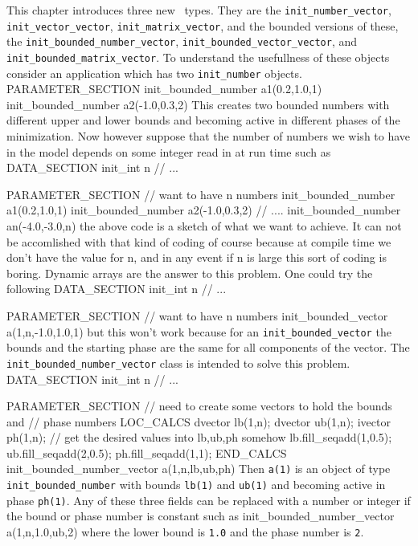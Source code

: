 %
%
This chapter introduces three new \ADM\ types. They are
the {\tt init\_number\_vector}, {\tt init\_vector\_vector}, 
{\tt init\_matrix\_vector}, and the bounded versions of these,
the {\tt init\_bounded\_number\_vector}, {\tt init\_bounded\_vector\_vector}, 
and {\tt init\_bounded\_matrix\_vector}.
To understand the usefullness of these objects consider an application
which has two {\tt init\_number} objects.
\beginexample
PARAMETER_SECTION
  init_bounded_number a1(0.2,1.0,1)
  init_bounded_number a2(-1.0,0.3,2)
\endexample 
\noindent This creates two bounded numbers with different
upper and lower bounds and becoming active in different phases
of the minimization.
Now however suppose that the number of numbers we wish to
have in the model depends on some integer read in at run time such as
\beginexample
DATA_SECTION
  init_int n
 //  ...

PARAMETER_SECTION
  // want to have n numbers
  init_bounded_number a1(0.2,1.0,1)
  init_bounded_number a2(-1.0,0.3,2)
  // ....
  init_bounded_number an(-4.0,-3.0,n)
\endexample 
\noindent the above code is a sketch of what we want to 
achieve. It can not be accomlished with that kind of coding
of course because at compile time we don't have the value for n,
and in any event if n is large this sort of coding is boring.
Dynamic arrays are the answer to this problem. One could try
the following
\beginexample
DATA_SECTION
  init_int n
 //  ...

PARAMETER_SECTION
  // want to have n numbers
  init_bounded_vector a(1,n,-1.0,1.0,1)
\endexample 
\noindent but this won't work because for an {\tt init\_bounded\_vector}
the bounds and the starting phase are the same for all components of
the vector. The {\tt init\_bounded\_number\_vector} class
is intended to solve this problem.
\beginexample
DATA_SECTION
  init_int n
 //  ...

PARAMETER_SECTION
  // need to create some vectors to hold the bounds and
  // phase numbers
 LOC_CALCS
  dvector lb(1,n); 
  dvector ub(1,n); 
  ivector ph(1,n); 
  // get the desired values into lb,ub,ph somehow 
  lb.fill_seqadd(1,0.5);
  ub.fill_seqadd(2,0.5);
  ph.fill_seqadd(1,1);
 END_CALCS
  init_bounded_number_vector a(1,n,lb,ub,ph)
\endexample 
\noindent Then {\tt a(1)} is an object of type
{\tt init\_bounded\_number} with bounds {\tt lb(1)} and 
{\tt ub(1)} and becoming active in phase {\tt ph(1)}. 
Any of these three fields can be replaced with a number or
integer if the bound or phase number is constant such as
\beginexample
  init_bounded_number_vector a(1,n,1.0,ub,2)
\endexample 
\noindent where the lower bound is {\tt 1.0} and the
phase number is {\tt 2}.


